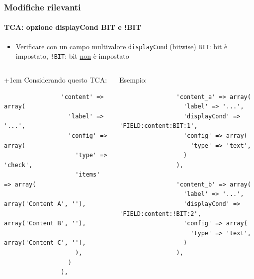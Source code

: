 
\begin{frame}[fragile]
	\frametitle{Modifiche rilevanti}
	\framesubtitle{TCA: opzione displayCond BIT e !BIT}

	\lstset{
		basicstyle=\tiny\ttfamily
	}

	\begin{itemize}
		\item Verificare con un campo multivalore \texttt{displayCond} (bitwise)\newline
			\texttt{BIT}: bit è impostato, \texttt{!BIT}: bit \underline{non} è impostato
	\end{itemize}

	\begin{columns}[T]

		\begin{column}{.5\textwidth}

			\advance\leftskip+1cm
			Considerando questo TCA:

			\lstset{xleftmargin=1cm}

			\begin{lstlisting}
				'content' => array(
				  'label' => '...',
				  'config' => array(
				    'type' => 'check',
				    'items' => array(
				      array('Content A', ''),
				      array('Content B', ''),
				      array('Content C', ''),
				    ),
				  )
				),
			\end{lstlisting}

		\end{column}
		\begin{column}{.5\textwidth}

			Esempio:

			\begin{lstlisting}
				'content_a' => array(
				  'label' => '...',
				  'displayCond' => 'FIELD:content:BIT:1',
				  'config' => array(
				    'type' => 'text',
				  )
				),

				'content_b' => array(
				  'label' => '...',
				  'displayCond' => 'FIELD:content:!BIT:2',
				  'config' => array(
				    'type' => 'text',
				  )
				),
			\end{lstlisting}
		\end{column}

	\end{columns}

\end{frame}


